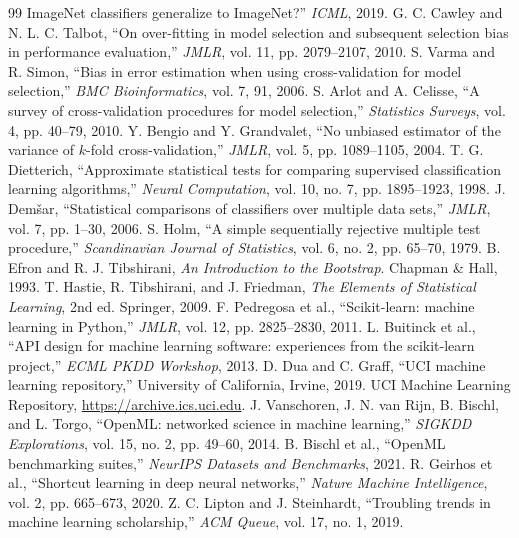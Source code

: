 \documentclass[10pt,twocolumn]{article}
\begin{document}
{\begin{thebibliography}{99}
ImageNet classifiers generalize to ImageNet?'' \emph{ICML}, 2019.
 G. C. Cawley and N. L. C. Talbot, ``On over-fitting in
model selection and subsequent selection bias in performance evaluation,''
\emph{JMLR}, vol. 11, pp. 2079--2107, 2010.
 S. Varma and R. Simon, ``Bias in error estimation when using
cross-validation for model selection,'' \emph{BMC Bioinformatics}, vol. 7, 91,
2006.
 S. Arlot and A. Celisse, ``A survey of cross-validation
procedures for model selection,'' \emph{Statistics Surveys}, vol. 4, pp. 40--79,
2010.
 Y. Bengio and Y. Grandvalet, ``No unbiased estimator of the
variance of $k$-fold cross-validation,'' \emph{JMLR}, vol. 5, pp. 1089--1105,
2004.
 T. G. Dietterich, ``Approximate statistical tests for
comparing supervised classification learning algorithms,'' \emph{Neural
Computation}, vol. 10, no. 7, pp. 1895--1923, 1998.
 J. Dem\v{s}ar, ``Statistical comparisons of classifiers over
multiple data sets,'' \emph{JMLR}, vol. 7, pp. 1--30, 2006.
 S. Holm, ``A simple sequentially rejective multiple test
procedure,'' \emph{Scandinavian Journal of Statistics}, vol. 6, no. 2,
pp. 65--70, 1979.
 B. Efron and R. J. Tibshirani, \emph{An Introduction to the
Bootstrap}. Chapman \& Hall, 1993.
 T. Hastie, R. Tibshirani, and J. Friedman, \emph{The
Elements of Statistical Learning}, 2nd ed. Springer, 2009.
 F. Pedregosa et al., ``Scikit-learn: machine learning in
Python,'' \emph{JMLR}, vol. 12, pp. 2825--2830, 2011.
 L. Buitinck et al., ``API design for machine learning
software: experiences from the scikit-learn project,'' \emph{ECML PKDD Workshop},
2013.
 D. Dua and C. Graff, ``UCI machine learning repository,''
University of California, Irvine, 2019.
 UCI Machine Learning Repository, \url{https://archive.ics.uci.edu}.
 J. Vanschoren, J. N. van Rijn, B. Bischl, and L. Torgo,
``OpenML: networked science in machine learning,'' \emph{SIGKDD Explorations},
vol. 15, no. 2, pp. 49--60, 2014.
 B. Bischl et al., ``OpenML benchmarking suites,''
\emph{NeurIPS Datasets and Benchmarks}, 2021.
 R. Geirhos et al., ``Shortcut learning in deep neural
networks,'' \emph{Nature Machine Intelligence}, vol. 2, pp. 665--673, 2020.
 Z. C. Lipton and J. Steinhardt, ``Troubling trends in
machine learning scholarship,'' \emph{ACM Queue}, vol. 17, no. 1, 2019.

\end{thebibliography}}
\end{document}
